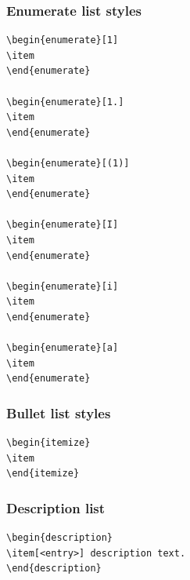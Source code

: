 \documentclass[AMA,STIX1COL]{WileyNJD-v2}
\begin{document}
\subsubsection{Enumerate list styles}
\begin{verbatim}
\begin{enumerate}[1]
\item 
\end{enumerate}

\begin{enumerate}[1.]
\item 
\end{enumerate}

\begin{enumerate}[(1)]
\item 
\end{enumerate}

\begin{enumerate}[I]
\item 
\end{enumerate}

\begin{enumerate}[i]
\item 
\end{enumerate}

\begin{enumerate}[a]
\item 
\end{enumerate}

\end{verbatim}

\subsubsection{Bullet list styles}

\begin{verbatim}
\begin{itemize}
\item 
\end{itemize}
\end{verbatim}

\subsubsection{Description list}

\begin{verbatim}
\begin{description}
\item[<entry>] description text.
\end{description}
\end{verbatim}
\end{document}
